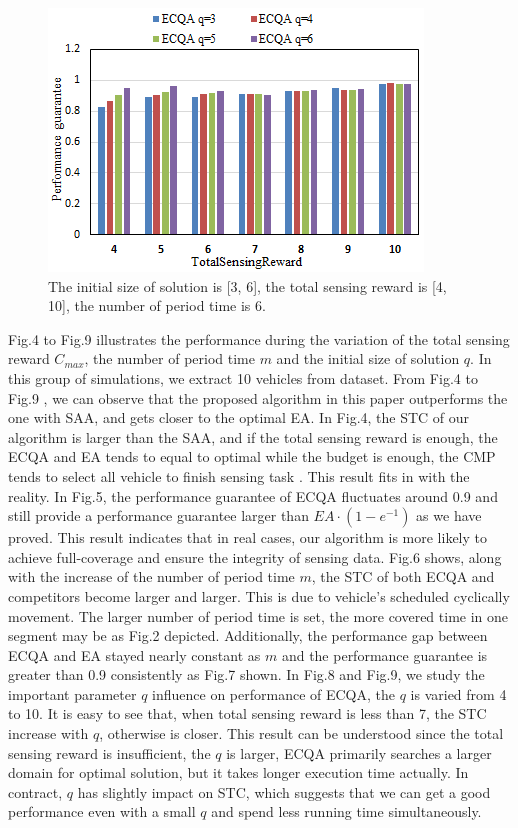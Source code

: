 \documentclass[journal]{IEEEtran}
\begin{document}
\begin{figure}
	\centering
	\includegraphics[width=1\linewidth]{Fig4(f).png}
	\caption{The initial size of solution is [3, 6], the total sensing reward is [4, 10], the number of period time is 6.}
	\label{fig:figure5}
\end{figure}
Fig.4 to Fig.9 illustrates the performance during the variation of the total sensing reward $C_{max}$, the number of period time $m$ and the initial size of solution $q$. In this group of simulations, we extract 10 vehicles from dataset. From Fig.4 to Fig.9 , we can observe that the proposed algorithm in this paper outperforms the one with SAA, and gets closer to the optimal EA. In Fig.4, the STC of our algorithm is larger than the SAA, and if the total sensing reward is enough, the ECQA and EA tends to equal to optimal while the budget is enough, the CMP tends to select all vehicle to finish sensing task . This result fits in with the reality. In Fig.5, the performance guarantee of ECQA fluctuates around 0.9 and still provide a performance guarantee larger than $EA\cdot(1-e^{-1})$ as we have proved. This result indicates that in real cases, our algorithm is more likely to achieve full-coverage and ensure the integrity of sensing data. Fig.6 shows, along with the increase of the number of period time $m$, the STC of both ECQA and competitors become larger and larger. This is due to vehicle's scheduled cyclically movement. The larger number of period time is set, the more covered time in one segment may be as Fig.2 depicted. Additionally, the performance gap between ECQA and EA stayed nearly constant as $m$ and the performance guarantee is greater than 0.9 consistently as Fig.7 shown. In Fig.8 and Fig.9, we study the important parameter $q$ influence on performance of ECQA, the $q$ is varied from 4 to 10. It is easy to see that, when total sensing reward is less than 7, the STC increase with $q$, otherwise is closer. This result can be understood since the total sensing reward is insufficient, the $q$ is larger, ECQA primarily searches a larger domain for optimal solution, but it takes longer execution time actually. In contract, $q$ has slightly impact on STC, which suggests that we can get a good performance even with a small $q$ and spend less running time simultaneously. 
\end{document}
